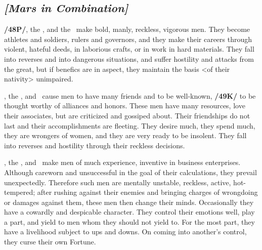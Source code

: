 \secbr
\subsection{\textit{[Mars in Combination]}}
\textbf{/48P/}\Mars, the \Sun, and the \Moon\, make bold, manly, reckless, vigorous men. They become athletes and soldiers, rulers and governors, and they make their careers through violent, hateful deeds, in laborious crafts, or in work in hard materials. They fall into reverses and into dangerous situations, and suffer hostility and attacks from the great, but if benefics are in aspect, they maintain the basis <of their nativity> unimpaired.

\Mars, the \Sun, and \Venus\, cause men to have many friends and to be well-known, \textbf{/49K/} to be thought worthy of alliances and honors. These men have many resources, love their associates, but are criticized and gossiped about. Their friendships do not last and their accomplishments are fleeting. They desire much, they spend much, they are wrongers of women, and they are very ready to be insolent. They fall into reverses and hostility through their reckless decisions.

\Mars, the \Sun, and \Mercury\, make men of much experience, inventive in business enterprises. Although careworn and unsuccessful in the goal of their calculations, they prevail unexpectedly. Therefore such men are mentally unstable, reckless, active, hot-tempered; after rushing against their enemies and bringing charges of wrongdoing or damages against them, these men then change their minds.
Occasionally they have a cowardly and despicable character. They control their emotions well, play a part, and yield to men whom they should not yield to. For the most part, they have a livelihood subject to ups and downs. On coming into another’s control, they curse their own Fortune.

